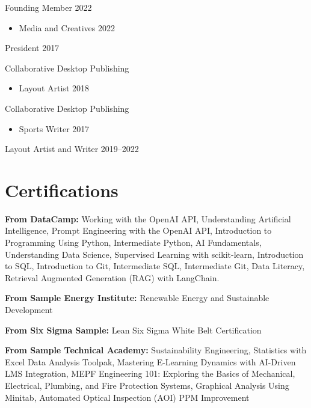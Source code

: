\documentclass[10pt,a4paper]{article}
\begin{document}
Founding Member \hfill 2022
\begin{itemize}
    \item Media and Creatives \hfill 2022
\end{itemize}

President \hfill 2017

Collaborative Desktop Publishing
\begin{itemize}
    \item Layout Artist \hfill 2018
\end{itemize}

Collaborative Desktop Publishing
\begin{itemize}
    \item Sports Writer \hfill 2017
\end{itemize}

Layout Artist and Writer \hfill 2019--2022

\section*{Certifications}

\textbf{From DataCamp:} Working with the OpenAI API, Understanding Artificial Intelligence, Prompt Engineering with the OpenAI API, Introduction to Programming Using Python, Intermediate Python, AI Fundamentals, Understanding Data Science, Supervised Learning with scikit-learn, Introduction to SQL, Introduction to Git, Intermediate SQL, Intermediate Git, Data Literacy, Retrieval Augmented Generation (RAG) with LangChain.

\textbf{From Sample Energy Institute:} Renewable Energy and Sustainable Development

\textbf{From Six Sigma Sample:} Lean Six Sigma White Belt Certification

\textbf{From Sample Technical Academy:} Sustainability Engineering, Statistics with Excel Data Analysis Toolpak, Mastering E-Learning Dynamics with AI-Driven LMS Integration, MEPF Engineering 101: Exploring the Basics of Mechanical, Electrical, Plumbing, and Fire Protection Systems, Graphical Analysis Using Minitab, Automated Optical Inspection (AOI) PPM Improvement
\end{document}
